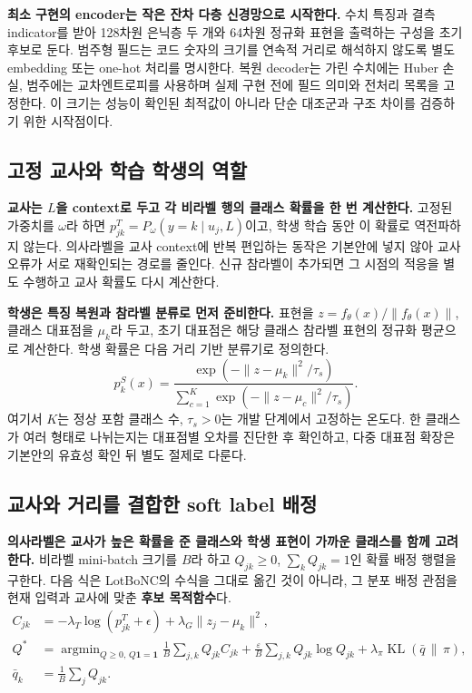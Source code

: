 \textbf{최소 구현의 encoder는 작은 잔차 다층 신경망으로 시작한다.} 수치 특징과 결측 indicator를 받아 128차원 은닉층 두 개와 64차원 정규화 표현을 출력하는 구성을 초기 후보로 둔다. 범주형 필드는 코드 숫자의 크기를 연속적 거리로 해석하지 않도록 별도 embedding 또는 one-hot 처리를 명시한다. 복원 decoder는 가린 수치에는 Huber 손실, 범주에는 교차엔트로피를 사용하며 실제 구현 전에 필드 의미와 전처리 목록을 고정한다. 이 크기는 성능이 확인된 최적값이 아니라 단순 대조군과 구조 차이를 검증하기 위한 시작점이다.

\subsection{고정 교사와 학습 학생의 역할}
\textbf{교사는 $L$을 context로 두고 각 비라벨 행의 클래스 확률을 한 번 계산한다.} 고정된 가중치를 $\omega$라 하면 $p^T_{jk}=P_\omega(y=k\mid u_j,L)$이고, 학생 학습 동안 이 확률로 역전파하지 않는다. 의사라벨을 교사 context에 반복 편입하는 동작은 기본안에 넣지 않아 교사 오류가 서로 재확인되는 경로를 줄인다. 신규 참라벨이 추가되면 그 시점의 적응을 별도 수행하고 교사 확률도 다시 계산한다.

\textbf{학생은 특징 복원과 참라벨 분류로 먼저 준비한다.} 표현을 $z=f_\theta(x)/\|f_\theta(x)\|$, 클래스 대표점을 $\mu_k$라 두고, 초기 대표점은 해당 클래스 참라벨 표현의 정규화 평균으로 계산한다. 학생 확률은 다음 거리 기반 분류기로 정의한다.
\begin{equation}
 p^S_k(x)=\frac{\exp(-\|z-\mu_k\|^2/\tau_s)}
 {\sum_{c=1}^{K}\exp(-\|z-\mu_c\|^2/\tau_s)}.
\end{equation}
여기서 $K$는 정상 포함 클래스 수, $\tau_s>0$는 개발 단계에서 고정하는 온도다. 한 클래스가 여러 형태로 나뉘는지는 대표점별 오차를 진단한 후 확인하고, 다중 대표점 확장은 기본안의 유효성 확인 뒤 별도 절제로 다룬다.

\subsection{교사와 거리를 결합한 soft label 배정}
\textbf{의사라벨은 교사가 높은 확률을 준 클래스와 학생 표현이 가까운 클래스를 함께 고려한다.} 비라벨 mini-batch 크기를 $B$라 하고 $Q_{jk}\geq0$, $\sum_kQ_{jk}=1$인 확률 배정 행렬을 구한다. 다음 식은 LotBoNC의 수식을 그대로 옮긴 것이 아니라, 그 분포 배정 관점을 현재 입력과 교사에 맞춘 \textbf{후보 목적함수}다.
\begin{align}
 C_{jk}&=-\lambda_T\log(p^T_{jk}+\epsilon)
          +\lambda_G\|z_j-\mu_k\|^2,\\
 Q^*&=\mathop{\arg\min}_{Q\geq0,\,Q\mathbf1=\mathbf1}
 \frac1B\sum_{j,k}Q_{jk}C_{jk}
 +\frac{\varepsilon}{B}\sum_{j,k}Q_{jk}\log Q_{jk}
 +\lambda_\pi\operatorname{KL}(\bar q\,\|\,\pi),\label{eq:assignment}\\
 \bar q_k&=\frac1B\sum_jQ_{jk}.
\end{align}

